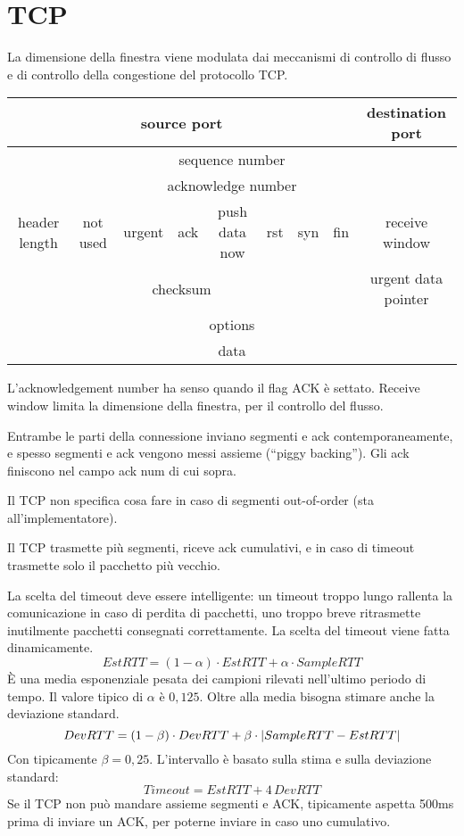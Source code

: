 \section{TCP}

La dimensione della finestra viene modulata dai meccanismi di controllo di flusso e di controllo della congestione del protocollo TCP.

\begin{center}
\begin{tabular}{|*{32}{c|}}
\hline
\multicolumn{16}{|c|}{source port} & \multicolumn{16}{c|}{destination port} \\
\hline
\multicolumn{32}{|c|}{sequence number} \\
\hline
\multicolumn{32}{|c|}{acknowledge number} \\
\hline
\multicolumn{5}{|c|}{header length} & \multicolumn{5}{c|}{not used} & \multicolumn{1}{c|}{urgent} & \multicolumn{1}{c|}{ack} & \multicolumn{1}{c|}{push data now} & \multicolumn{1}{c|}{rst} & \multicolumn{1}{c|}{syn} & \multicolumn{1}{c|}{fin} & \multicolumn{16}{c|}{receive window} \\
\hline
\multicolumn{16}{|c|}{checksum} & \multicolumn{16}{c|}{urgent data pointer} \\
\hline
\multicolumn{32}{|c|}{options} \\
\hline
\multicolumn{32}{|c|}{data} \\
\hline
\end{tabular}
\end{center}

L'acknowledgement number ha senso quando il flag ACK \`e settato. Receive window limita la dimensione della finestra, per il controllo del flusso.

Entrambe le parti della connessione inviano segmenti e ack contemporaneamente, e spesso segmenti e ack vengono messi assieme (``piggy backing''). Gli ack finiscono nel campo ack num di cui sopra.

Il TCP non specifica cosa fare in caso di segmenti out-of-order (sta all'implementatore).

Il TCP trasmette pi\`u segmenti, riceve ack cumulativi, e in caso di timeout trasmette solo il pacchetto pi\`u vecchio.

La scelta del timeout deve essere intelligente: un timeout troppo lungo rallenta la comunicazione in caso di perdita di pacchetti, uno troppo breve ritrasmette inutilmente pacchetti consegnati correttamente. La scelta del timeout viene fatta dinamicamente.
\[
EstRTT = (1 - \alpha) \cdot EstRTT + \alpha \cdot SampleRTT
\]
\`E una media esponenziale pesata dei campioni rilevati nell'ultimo periodo di tempo. Il valore tipico di $\alpha$ \`e $0,125$. Oltre alla media bisogna stimare anche la deviazione standard.
\[
DevRTT = (1 - \beta) \cdot DevRTT + \beta \cdot \left\lvert{SampleRTT - EstRTT}\right\rvert
\]
Con tipicamente $\beta = 0,25$. L'intervallo \`e basato sulla stima e sulla deviazione standard:
\[
Timeout = EstRTT + 4 \, DevRTT
\]
Se il TCP non pu\`o mandare assieme segmenti e ACK, tipicamente aspetta 500ms prima di inviare un ACK, per poterne inviare in caso uno cumulativo.

